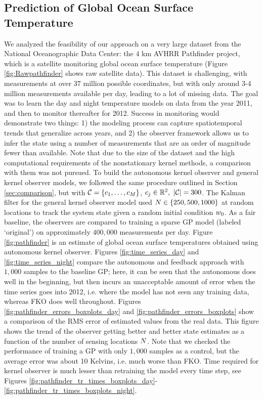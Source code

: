 \subsection{Prediction of Global Ocean Surface Temperature}\label{sec:avhhr}
We analyzed the feasibility of our approach on a very large dataset from the National Oceanographic Data Center: the $4$ km AVHRR Pathfinder project, which is a satellite monitoring global ocean surface temperature (Figure \ref{fig:Rawpathfinder} shows raw satellite data). This dataset is challenging, with measurements at over $37$ million possible coordinates, but with only around 3-4 million measurements available per day, leading to a lot of missing data. The goal was to learn the day and night temperature models on data from the year 2011, and then to monitor  thereafter for 2012. Success in monitoring would demonstrate two things: 1) the modeling process can capture spatiotemporal trends that generalize across years, and 2) the observer framework allows us to infer the state using a number of measurements that are an order of magnitude fewer than available. Note that due to the size of the dataset and the high computational requirements of the nonstationary kernel methods, a comparison with them was not pursued. To build the autonomous kernel observer and general kernel observer models, we followed the same procedure outlined in Section \ref{sec:comparison}, but with $\mathcal{C}=\{c_1,\dots,c_{M}\}$, $c_{j}\in\mathbb{R}^{2}, \ |\mathcal{C}| = 300$. The Kalman filter for the general kernel observer model  used $N \in \{250,500,1000\}$ at random locations to track the system state given a random initial condition $w_0$. As a fair baseline, the observers are compared to training a sparse GP model (labeled `original')  on approximately $400,000$ measurements per day. %
Figure \ref{fig:pathfinder} is an estimate of global ocean surface temperatures obtained using autonomous kernel observer.
Figures \ref{fig:time_series_day} and \ref{fig:time_series_night} compare the autonomous and feedback approach with $1,000$ samples to the baseline GP; here, it can be seen that the autonomous does well in the beginning, but then incurs an unacceptable amount of error when the time series goes into 2012, i.e. where the model has not seen any training data, whereas FKO does well throughout. 
Figures %
\ref{fig:pathfinder_errors_boxplots_day} 
and %
\ref{fig:pathfinder_errors_boxplots} 
show a  comparison of the RMS error of estimated values from the real data.
This figure shows the trend of the observer getting better and better state estimates as a function of the number of sensing locations $N$. Note that we checked the performance of training a GP with only $1,000$ samples as a control, but the average error was about 10 Kelvins, i.e. much worse than FKO.
 Time required for kernel observer is much lesser than retraining the model every time step, see Figures %
 \ref{fig:pathfinder_tr_times_boxplots_day}-\ref{fig:pathfinder_tr_times_boxplots_night}.
 
